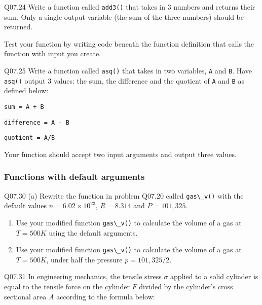 \documentclass{book}
\newcommand{\passthrough}[1]{#1}
\begin{document}
Q07.24 Write a function called \passthrough{\lstinline!add3()!} that
takes in 3 numbers and returns their sum. Only a single output variable
(the sum of the three numbers) should be returned.

Test your function by writing code beneath the function definition that
calls the function with input you create.

Q07.25 Write a function called \passthrough{\lstinline!asq()!} that
takes in two variables, \passthrough{\lstinline!A!} and
\passthrough{\lstinline!B!}. Have \passthrough{\lstinline!asq()!} output
3 values: the sum, the difference and the quotient of
\passthrough{\lstinline!A!} and \passthrough{\lstinline!B!} as defined
below:

\passthrough{\lstinline!sum = A + B!}

\passthrough{\lstinline!difference = A - B!}

\passthrough{\lstinline!quotient = A/B!}

Your function should accept two input arguments and output three values.
    




    
        \hypertarget{functions-with-default-arguments}{%
\subsubsection{Functions with default
arguments}\label{functions-with-default-arguments}}

Q07.30 (a) Rewrite the function in problem Q07.20 called
\passthrough{\lstinline!gas\_v()!} with the default values
\(n = 6.02 \times 10^{23}\), \(R = 8.314\) and \(P = 101,325\).

\begin{enumerate}
\def\labelenumi{(\alph{enumi})}
\item
  Use your modified function \passthrough{\lstinline!gas\_v()!} to
  calculate the volume of a gas at \(T = 500 K\) using the default
  arguments.
\item
  Use your modified function \passthrough{\lstinline!gas\_v()!} to
  calculate the volume of a gas at \(T = 500K\), under half the pressure
  \(p = 101,325/2\).
\end{enumerate}

Q07.31 In engineering mechanics, the tensile stress \(\sigma\) applied
to a solid cylinder is equal to the tensile force on the cylinder \(F\)
divided by the cylinder's cross sectional area \(A\) according to the
formula below:
\end{document}
